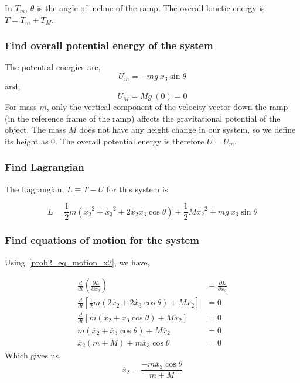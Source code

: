 \documentclass[conference]{IEEEtran}
\begin{document}
In $T_m$, $\theta$ is the angle of incline of the ramp. The overall kinetic energy is $T = T_m + T_M$.

\subsubsection{Find overall potential energy of the system}

The potential energies are,
\[
    U_m = -mg~x_3\sin\theta
\]
and,
\[
    U_M = Mg~(0) = 0
\]
For mass $m$, only the vertical component of the velocity vector down the ramp (in the reference frame of the 
ramp) affects the gravitational potential of the object. The mass $M$ does not have any height change in
our system, so we define its height as 0. The overall potential energy is therefore $U = U_m$.

\subsubsection{Find Lagrangian}

The Lagrangian, $L \equiv T  - U$ for this system is

\begin{equation}
    L = \frac{1}{2} m \left( \dot{x_2}^2 + \dot{x_3}^2 + 2\dot{x_2}\dot{x_3}\cos\theta\right) + \frac{1}{2} M \dot{x_2}^2 + mg~x_3\sin\theta
\end{equation}

\subsubsection{Find equations of motion for the system}

Using~\ref{prob2_eq_motion_x2}, we have,

\begin{align*}
    \frac{d}{dt} \left(\frac{\partial L}{\partial \dot{x_2}}\right) &= \frac{\partial L}{ \partial x_2}\\
    \frac{d}{dt} \left[ \frac{1}{2} m \left( 2\dot{x_2} + 2\dot{x_3}\cos\theta \right) 
     + M \dot{x_2} \right] &= 0\\
    \frac{d}{dt} \left[ m \left( \dot{x_2} + \dot{x_3}\cos\theta \right) 
     + M \dot{x_2} \right] &= 0\\
    m (\ddot{x_2} + \ddot{x_3}\cos\theta) + M \ddot{x_2} &= 0\\
    \ddot{x_2}(m + M) + m\ddot{x_3}\cos\theta &= 0
\end{align*}
Which gives us,
\begin{equation}\label{prob2_obj}
    \ddot{x_2} = \frac{- m\ddot{x_3}\cos\theta}{m + M}
\end{equation}
\end{document}
